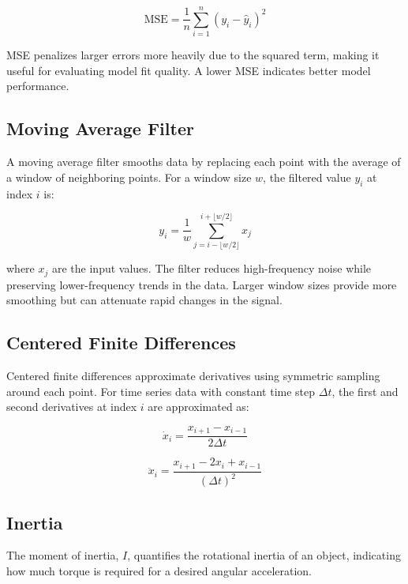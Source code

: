 \begin{equation}
\label{eq:mse}
\text{MSE} = \frac{1}{n}\sum_{i=1}^n (y_i - \hat{y}_i)^2
\end{equation}

MSE penalizes larger errors more heavily due to the squared term, making it useful for evaluating model fit quality. A lower MSE indicates better model performance.


\subsection{Moving Average Filter}
A moving average filter smooths data by replacing each point with the average of a window of neighboring points. For a window size \(w\), the filtered value \(y_i\) at index \(i\) is:

\begin{equation}
\label{eq:moving_average}
y_i = \frac{1}{w}\sum_{j=i-\lfloor w/2 \rfloor}^{i+\lfloor w/2 \rfloor} x_j
\end{equation}

where \(x_j\) are the input values. The filter reduces high-frequency noise while preserving lower-frequency trends in the data. Larger window sizes provide more smoothing but can attenuate rapid changes in the signal.

\subsection{Centered Finite Differences}
Centered finite differences approximate derivatives using symmetric sampling around each point. For time series data with constant time step \(\Delta t\), the first and second derivatives at index \(i\) are approximated as:

\begin{equation}
\label{eq:first_derivative}
\dot{x}_i = \frac{x_{i+1} - x_{i-1}}{2\Delta t}
\end{equation}

\begin{equation}
\label{eq:second_derivative}
\ddot{x}_i = \frac{x_{i+1} - 2x_i + x_{i-1}}{(\Delta t)^2}
\end{equation}

\subsection{Inertia}
\label{sec:inertia}
The moment of inertia, \(I\), quantifies the rotational inertia of an object, indicating how much torque is required for a desired angular acceleration.


